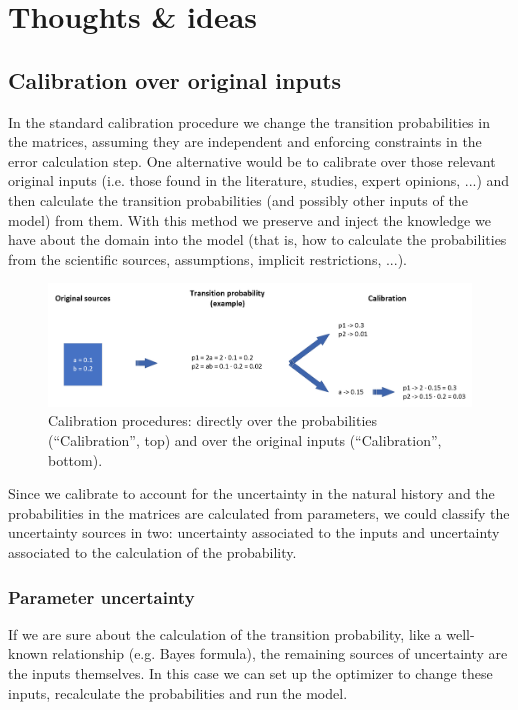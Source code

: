 
\chapter{Thoughts \& ideas} %

\label{sec:ideas} %

\section{Calibration over original inputs}

In the standard calibration procedure we change the transition probabilities in the matrices, assuming they are independent and enforcing constraints in the error calculation step. One alternative would be to calibrate over those relevant original inputs (i.e. those found in the literature, studies, expert opinions, ...) and then calculate the transition probabilities (and possibly other inputs of the model) from them. With this method we preserve and inject the knowledge we have about the domain into the model (that is, how to calculate the probabilities from the scientific sources, assumptions, implicit restrictions, ...).

\begin{figure}[h]
	\centering
	\includegraphics[width=\textwidth]{figures/calibration_inputs}
	\decoRule
	\caption[Calibration over inputs]{Calibration procedures: directly over the probabilities (``Calibration'', top) and over the original inputs (``Calibration'', bottom).}
	\label{fig:calibration_inputs}
\end{figure}

Since we calibrate to account for the uncertainty in the natural history and the probabilities in the matrices are calculated from parameters, we could classify the uncertainty sources in two: uncertainty associated to the inputs and uncertainty associated to the calculation of the probability.

\subsection{Parameter uncertainty}
If we are sure about the calculation of the transition probability, like a well-known relationship (e.g. Bayes formula), the remaining sources of uncertainty are the inputs themselves. In this case we can set up the optimizer to change these inputs, recalculate the probabilities and run the model.

